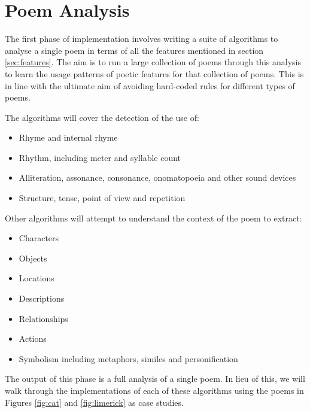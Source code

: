 \def\baselinestretch{1}
\chapter{Poem Analysis}
\ifpdf
    \graphicspath{{Theory/TheoryFigs/PNG/}{Theory/TheoryFigs/PDF/}{Theory/TheoryFigs/}}
\else
    \graphicspath{{Theory/TheoryFigs/EPS/}{Theory/TheoryFigs/}}
\fi

\def\baselinestretch{1.66}

The first phase of implementation involves writing a suite of algorithms to analyse a single poem in terms of all the features mentioned in section \ref{sec:features}. The aim is to run a large collection of poems through this analysis to learn the usage patterns of poetic features for that collection of poems. This is in line with the ultimate aim of avoiding hard-coded rules for different types of poems.

The algorithms will cover the detection of the use of:
\begin{itemize}
\setlength{\itemsep}{0pt}
\item{Rhyme and internal rhyme}
\item{Rhythm, including meter and syllable count}
\item{Alliteration, assonance, consonance, onomatopoeia and other sound devices}
\item{Structure, tense, point of view and repetition}
\end{itemize}

Other algorithms will attempt to understand the context of the poem to extract:
\begin{itemize}
\setlength{\itemsep}{0pt}
\item{Characters}
\item{Objects}
\item{Locations}
\item{Descriptions}
\item{Relationships}
\item{Actions}
\item{Symbolism including metaphors, similes and personification}
\end{itemize}

The output of this phase is a full analysis of a single poem. In lieu of this, we will walk through the implementations of each of these algorithms using the poems in Figures \ref{fig:cat} and \ref{fig:limerick} as case studies.


